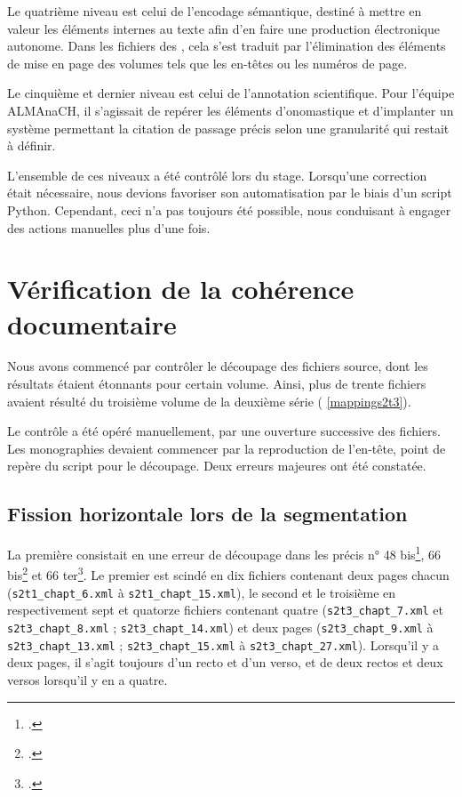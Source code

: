 Le quatrième niveau est celui de l'encodage sémantique, destiné à mettre en valeur les éléments internes au texte afin d'en faire une production électronique autonome. Dans les fichiers des \odm, cela s'est traduit par l'élimination des éléments de mise en page des volumes tels que les en-têtes ou les numéros de page.

Le cinquième et dernier niveau est celui de l'annotation scientifique. Pour l'équipe ALMAnaCH, il s'agissait de repérer les éléments d'onomastique et d'implanter un système permettant la citation de passage précis selon une granularité qui restait à définir.

L'ensemble de ces niveaux a été contrôlé lors du stage. Lorsqu'une correction était nécessaire, nous devions favoriser son automatisation par le biais d'un script Python. Cependant, ceci n’a pas toujours été possible, nous conduisant à engager des actions manuelles plus d'une fois.

\section{Vérification de la cohérence documentaire}

Nous avons commencé par contrôler le découpage des fichiers source, dont les résultats étaient étonnants pour certain volume. Ainsi, plus de trente fichiers avaient résulté du troisième volume de la deuxième série (\ann{} \ref{mappings2t3}).

Le contrôle a été opéré manuellement, par une ouverture successive des fichiers. Les monographies devaient commencer par la reproduction de l'en-tête, point de repère du script \lse{} pour le découpage. Deux erreurs majeures ont été constatée.

\subsection{Fission horizontale lors de la segmentation}

La première consistait en une erreur de découpage dans les précis n° 48 bis\footcite{mono048b}, 66 bis\footcite{mono066b} et 66 ter\footcite{mono066c}. Le premier est scindé en dix fichiers contenant deux pages chacun (\texttt{s2t1\_chapt\_6.xml} à \texttt{s2t1\_chapt\_15.xml}), le second et le troisième en respectivement sept et quatorze fichiers contenant quatre (\texttt{s2t3\_chapt\_7.xml} et \texttt{s2t3\_chapt\_8.xml} ; \texttt{s2t3\_chapt\_14.xml}) et deux pages (\texttt{s2t3\_chapt\_9.xml} à \texttt{s2t3\_chapt\_13.xml} ; \texttt{s2t3\_\-chapt\_15.xml} à \texttt{s2t3\_chapt\_27.xml}). Lorsqu'il y a deux pages, il s'agit toujours d'un recto et d'un verso, et de deux rectos et deux versos lorsqu'il y en a quatre.

